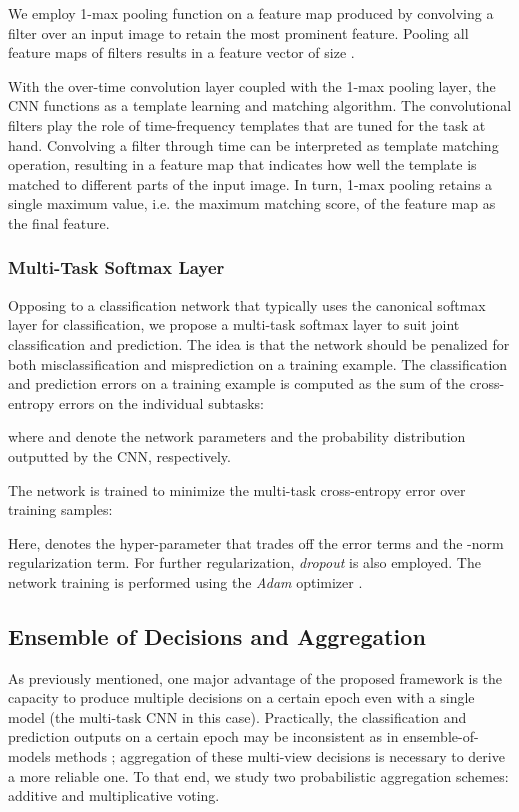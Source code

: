 \documentclass[10pt,twocolumn,twoside]{IEEEtran}
\begin{document}
We employ 1-max pooling function \cite{Kim2014, Phan2016} on a feature map produced by convolving a filter over an input image to retain the most prominent feature. Pooling all feature maps of  filters results in a feature vector of size .

With the over-time convolution layer coupled with the 1-max pooling layer, the CNN functions as a template learning and matching algorithm. The convolutional filters play the role of time-frequency templates that are tuned for the task at hand. Convolving a filter through time can be interpreted as template matching operation, resulting in a feature map that indicates how well the template is matched to different parts of the input image. In turn, 1-max pooling retains a single maximum value, i.e. the maximum matching score, of the feature map as the final feature.

\subsubsection{Multi-Task Softmax Layer}

Opposing to a classification network that typically uses the canonical softmax layer for classification, we propose a multi-task softmax layer to suit joint classification and prediction. The idea is that the network should be penalized for both misclassification and misprediction on a training example. The classification and prediction errors on a training example  is computed as the sum of the cross-entropy errors on the individual subtasks:

where  and  denote the network parameters and the probability distribution outputted by the CNN, respectively.

The network is trained to minimize the multi-task cross-entropy error over  training samples:

Here,  denotes the hyper-parameter that trades off the error terms and the -norm regularization term. For further regularization, \emph{dropout} \cite{Srivastava2014} is also employed. The network training is performed using the \emph{Adam} optimizer \cite{Kingma2015}.

\subsection{Ensemble of Decisions and Aggregation}
\label{ssec:aggregation}

As previously mentioned, one major advantage of the proposed framework is the capacity to produce multiple decisions on a certain epoch even with a single model (the multi-task CNN in this case). Practically, the classification and prediction outputs on a certain epoch may be inconsistent as in ensemble-of-models methods \cite{Hinton2015, Dietterich2000}; aggregation of these multi-view decisions is necessary to derive a more reliable one. 
To that end, we study two probabilistic aggregation schemes: additive and multiplicative voting.
\end{document}
